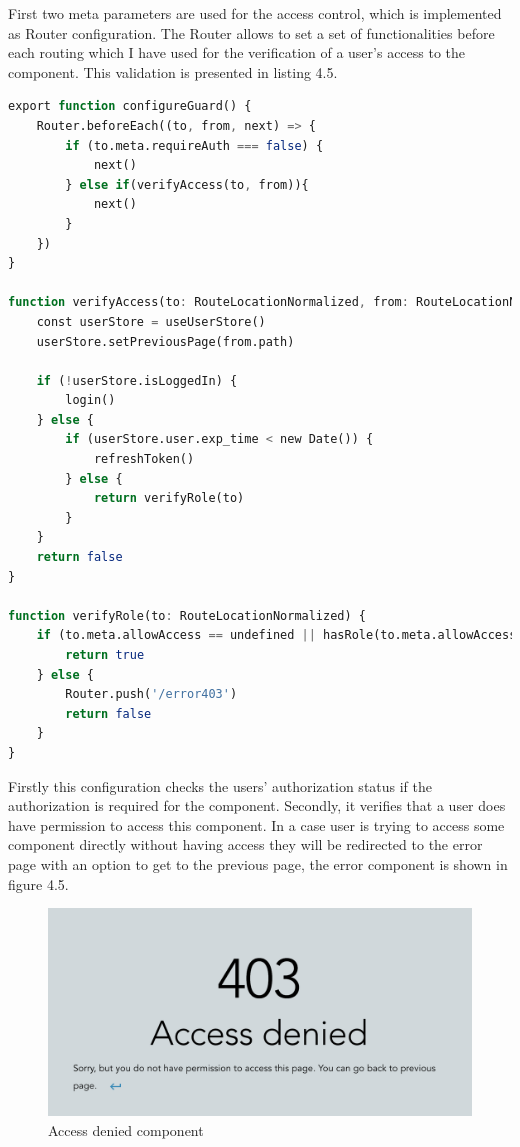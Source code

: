 \noindent First two meta parameters are used for the access control, which is implemented as Router configuration. The Router allows to set a set of functionalities before each routing which I have used for the verification of a user's access to the component. This validation is presented in listing 4.5.


\begin{lstlisting}[language=Octave, caption=Validation of access by role]
export function configureGuard() {
    Router.beforeEach((to, from, next) => {
        if (to.meta.requireAuth === false) {
            next()
        } else if(verifyAccess(to, from)){
            next()
        }
    })
}

function verifyAccess(to: RouteLocationNormalized, from: RouteLocationNormalized) {
    const userStore = useUserStore()
    userStore.setPreviousPage(from.path)
        
    if (!userStore.isLoggedIn) {
        login()
    } else {
        if (userStore.user.exp_time < new Date()) {
            refreshToken()
        } else {
            return verifyRole(to)
        }
    }
    return false
}

function verifyRole(to: RouteLocationNormalized) {
    if (to.meta.allowAccess == undefined || hasRole(to.meta.allowAccess as Role)) {
        return true
    } else {
        Router.push('/error403')
        return false
    }
}
\end{lstlisting}

\noindent Firstly this configuration checks the users' authorization status if the authorization is required for the component. Secondly, it verifies that a user does have permission to access this component. In a case user is trying to access some component directly without having access they will be redirected to the error page with an option to get to the previous page, the error component is shown in figure 4.5.

\begin{figure}[hp]
\centering
\includegraphics[scale=0.5]{../png/access_denied.png}
\caption{Access denied component}
\end{figure}



